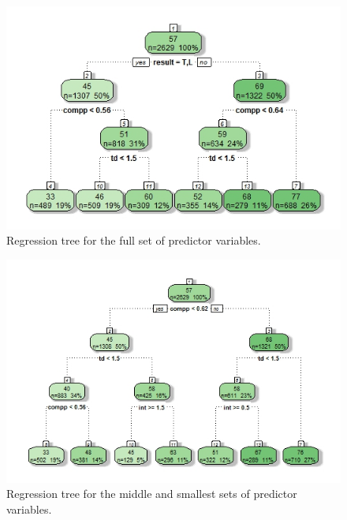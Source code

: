 \documentclass[12pt]{article}\usepackage[]{graphicx}\usepackage[]{color}
\begin{document}
\newpage

\begin{figure}[h]
\centering
\includegraphics[width=1.1\textwidth]{tree1.jpeg}
\captionsetup{font=footnotesize,labelfont=footnotesize}
\caption{\label{fig:tree1} Regression tree for the full set of predictor variables.}
\end{figure}
\newpage

\begin{figure}[h]
\centering
\includegraphics[width=1.1\textwidth]{tree2.jpeg}
\captionsetup{font=footnotesize,labelfont=footnotesize}
\caption{\label{fig:tree2} Regression tree for the middle and smallest sets of predictor variables.}
\end{figure}

\newpage
\end{document}
